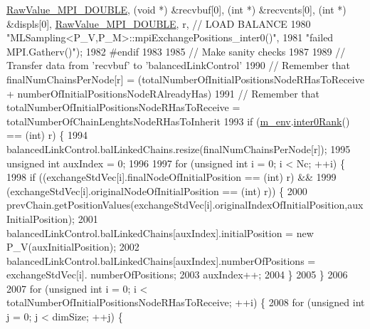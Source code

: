 \begin{DoxyCode}
      \hyperlink{_mpi_comm_8h_ad0f503bd9fecfe4e570ca3d15aaf2518}{RawValue\_MPI\_DOUBLE}, (\textcolor{keywordtype}{void} *) &recvbuf[0], (\textcolor{keywordtype}{int} *) &recvcnts[0], (\textcolor{keywordtype}{int} *) &displs[0], 
      \hyperlink{_mpi_comm_8h_ad0f503bd9fecfe4e570ca3d15aaf2518}{RawValue\_MPI\_DOUBLE}, r, \textcolor{comment}{// LOAD BALANCE}
1980                                \textcolor{stringliteral}{"MLSampling<P\_V,P\_M>::mpiExchangePositions\_inter0()"},
1981                                \textcolor{stringliteral}{"failed MPI.Gatherv()"});
1982 \textcolor{preprocessor}{#endif}
1983 \textcolor{preprocessor}{}
1985     \textcolor{comment}{// Make sanity checks}
1987 \textcolor{comment}{}
1989     \textcolor{comment}{// Transfer data from 'recvbuf' to 'balancedLinkControl'}
1990     \textcolor{comment}{// Remember that finalNumChainsPerNode[r] = (totalNumberOfInitialPositionsNodeRHasToReceive +
       numberOfInitialPositionsNodeRAlreadyHas)}
1991     \textcolor{comment}{// Remember that totalNumberOfInitialPositionsNodeRHasToReceive =
       totalNumberOfChainLenghtsNodeRHasToInherit}
1993 \textcolor{comment}{}    \textcolor{keywordflow}{if} (\hyperlink{class_q_u_e_s_o_1_1_m_l_sampling_a13f1ca4fe9f94822fe572a743eaced1d}{m\_env}.\hyperlink{class_q_u_e_s_o_1_1_base_environment_ae106b5bb8a80b655b88b3a26b1e7c185}{inter0Rank}() == (int) r) \{
1994       balancedLinkControl.balLinkedChains.resize(finalNumChainsPerNode[r]);
1995       \textcolor{keywordtype}{unsigned} \textcolor{keywordtype}{int} auxIndex = 0;
1996 
1997       \textcolor{keywordflow}{for} (\textcolor{keywordtype}{unsigned} \textcolor{keywordtype}{int} i = 0; i < Nc; ++i) \{
1998         \textcolor{keywordflow}{if} ((exchangeStdVec[i].finalNodeOfInitialPosition    == (\textcolor{keywordtype}{int}) r) &&
1999             (exchangeStdVec[i].originalNodeOfInitialPosition == (\textcolor{keywordtype}{int}) r)) \{
2000           prevChain.getPositionValues(exchangeStdVec[i].originalIndexOfInitialPosition,auxInitialPosition);
2001           balancedLinkControl.balLinkedChains[auxIndex].initialPosition = \textcolor{keyword}{new} P\_V(auxInitialPosition);
2002           balancedLinkControl.balLinkedChains[auxIndex].numberOfPositions = exchangeStdVec[i].
      numberOfPositions;
2003           auxIndex++;
2004   \}
2005       \}
2006 
2007       \textcolor{keywordflow}{for} (\textcolor{keywordtype}{unsigned} \textcolor{keywordtype}{int} i = 0; i < totalNumberOfInitialPositionsNodeRHasToReceive; ++i) \{
2008         \textcolor{keywordflow}{for} (\textcolor{keywordtype}{unsigned} \textcolor{keywordtype}{int} j = 0; j < dimSize; ++j) \{

\end{DoxyCode}
